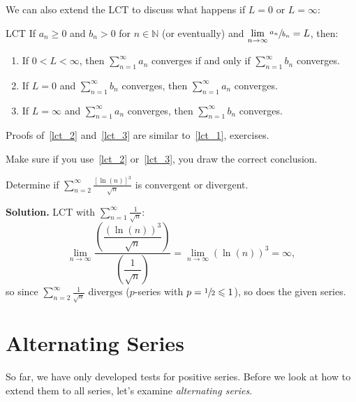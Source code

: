 We can also extend the LCT to discuss what happens if $ L=0 $ or $ L=\infty $:
\begin{Theorem}{LCT}{}
    If $ a_n\geqslant 0 $ and $ b_n>0 $ for $ n\in\mathbb{N} $ (or eventually)
    and $ \lim\limits_{{n} \to {\infty}} \sfrac{a_n}{b_n} =L $, then:
    \begin{enumerate}[label=(\arabic*)]
        \item\label{lct_1} If $ 0<L<\infty $, then $ \sum\limits_{n=1}^{\infty} a_n $ converges
              if and only if $ \sum\limits_{n=1}^{\infty}b_n $ converges.
        \item\label{lct_2} If $ L=0 $ and $ \sum\limits_{n=1}^{\infty} b_n $ converges, then
              $ \sum\limits_{n=1}^{\infty} a_n $ converges.
        \item\label{lct_3} If $ L=\infty $ and $ \sum\limits_{n=1}^{\infty} a_n $ converges,
              then $ \sum\limits_{n=1}^{\infty} b_n $ converges.
    \end{enumerate}
\end{Theorem}
Proofs of~\ref{lct_2} and~\ref{lct_3} are similar to~\ref{lct_1}, exercises.

\begin{Remark}{}{}
    Make sure if you use~\ref{lct_2} or~\ref{lct_3}, you draw the correct conclusion.
\end{Remark}

\begin{Example}{}{}
    Determine if
    $ \sum\limits_{n=2}^{\infty} \frac{\left[ \ln(n) \right]^3}{\sqrt{n}} $
    is convergent or divergent.

    \textbf{Solution.}
    LCT with $ \displaystyle \sum\limits_{n=1}^{\infty} \frac{1}{\sqrt{n}} $:
    \[ \lim\limits_{{n} \to {\infty}}
        \frac{\left(\dfrac{ \left( \ln(n) \right)^3}{\sqrt{n}} \right)}
        {
            \left( \dfrac{1}{\sqrt{n}} \right)
        }=
        \lim\limits_{{n} \to {\infty}} \left( \ln(n) \right)^3=\infty, \]
    so since $ \displaystyle \sum\limits_{n=2}^{\infty} \frac{1}{\sqrt{n}} $ diverges
    ($ p $-series with $ p=\sfrac{1}{2}\leqslant 1 $), so does
    the given series.
\end{Example}

\setcounter{section}{6}
\section{Alternating Series}
So far, we have only developed tests for positive series. Before we look at how to
extend them to all series, let's examine \emph{alternating series}.

